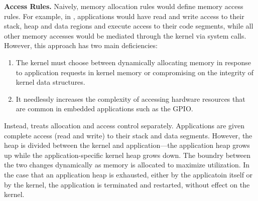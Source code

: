 {\bf Access Rules.}
Naively, memory allocation rules would define memory access rules. For example,
in \name, applications would have read and write access to their stack, heap and
data regions and execute access to their code segments, while all other memory
accesses would be mediated through the kernel via system calls. However, this
approach has two main deficiencies:

\begin{enumerate}
  \item The kernel must choose between dynamically allocating memory in response to
  application requests in kernel memory or compromising on the integrity of
  kernel data structures.

  \item It needlessly increases the complexity of accessing hardware resources
  that are common in embedded applications such as the GPIO.

\end{enumerate}

Instead, \name treats allocation and access control separately. Applications are
given complete access (read and write) to their stack and data segments.
However, the heap is divided between the kernel and application---the
application heap grows up while the application-specific kernel heap grows down.
The boundry between the two changes dynamically as memory is allocated to
maximize utilization. In the case that an application heap is exhausted, either
by the applicatoin itself or by the kernel, the application is terminated and
restarted, without effect on the kernel.

